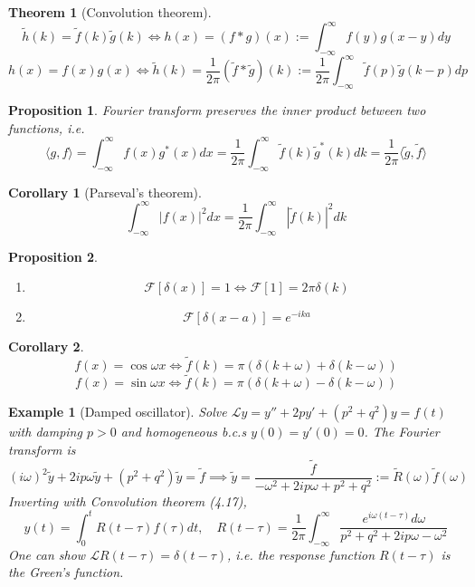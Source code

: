 \documentclass[a4paper]{article}
\newtheorem{eg}{Example}[section]
\theoremstyle{new}
\newtheorem{thm}{Theorem}[section]
\newtheorem{prop}{Proposition}[section]
\newtheorem{cor}{Corollary}[section]
\begin{document}
\begin{thm}[Convolution theorem]
$$\tilde{h}(k)=\tilde{f}(k)\tilde{g}(k)\iff h(x)=(f*g)(x):=\int_{-\infty}^\infty f(y)g(x-y)dy$$
$$h(x)=f(x)g(x)\iff\tilde{h}(k)=\frac{1}{2\pi}(\tilde{f}*\tilde{g})(k):=\frac{1}{2\pi}\int_{-\infty}^\infty\tilde{f}(p)\tilde{g}(k-p)dp$$
\end{thm}
\begin{prop} Fourier transform preserves the inner product between two functions, i.e.
$$\langle g,f\rangle=\int_{-\infty}^\infty f(x)g^*(x)dx=\frac{1}{2\pi}\int_{-\infty}^\infty\tilde{f}(k)\tilde{g}^*(k)dk=\frac{1}{2\pi}\langle\tilde{g},\tilde{f}\rangle$$
\end{prop}
\begin{cor}[Parseval's theorem]
$$\int_{-\infty}^\infty|f(x)|^2dx=\frac{1}{2\pi}\int_{-\infty}^\infty|\tilde{f}(k)|^2dk$$
\end{cor}
\begin{prop}\leavevmode
\begin{enumerate}
    \item 
$$\mathcal{F}[\delta(x)]=1\iff\mathcal{F}[1]=2\pi\delta(k)$$
    \item
$$\mathcal{F}[\delta(x-a)]=e^{-ika}$$
\end{enumerate}
\end{prop}
\begin{cor}
$$f(x)=\cos\omega x\iff\tilde{f}(k)=\pi(\delta(k+\omega)+\delta(k-\omega))$$
$$f(x)=\sin\omega x\iff\tilde{f}(k)=\pi(\delta(k+\omega)-\delta(k-\omega))$$
\end{cor}
\begin{eg}[Damped oscillator]
Solve $\mathcal{L}y=y''+2py'+(p^2+q^2)y=f(t)$ with damping $p>0$ and homogeneous b.c.s $y(0)=y'(0)=0$. The Fourier transform is
$$(i\omega)^2\tilde{y}+2ip\omega\tilde{y}+(p^2+q^2)\tilde{y}=\tilde{f}\implies\tilde{y}=\frac{\tilde{f}}{-\omega^2+2ip\omega+p^2+q^2}:=\tilde{R}(\omega)\tilde{f}(\omega)$$
Inverting with Convolution theorem (4.17),
$$y(t)=\int_0^tR(t-\tau)f(\tau)dt,\quad R(t-\tau)=\frac{1}{2\pi}\int_{-\infty}^\infty\frac{e^{i\omega(t-\tau)}d\omega}{p^2+q^2+2ip\omega-\omega^2}$$
One can show $\mathcal{L}R(t-\tau)=\delta(t-\tau)$, i.e. the response function $R(t-\tau)$ is the Green's function.
\end{eg}
\newpage
\end{document}
